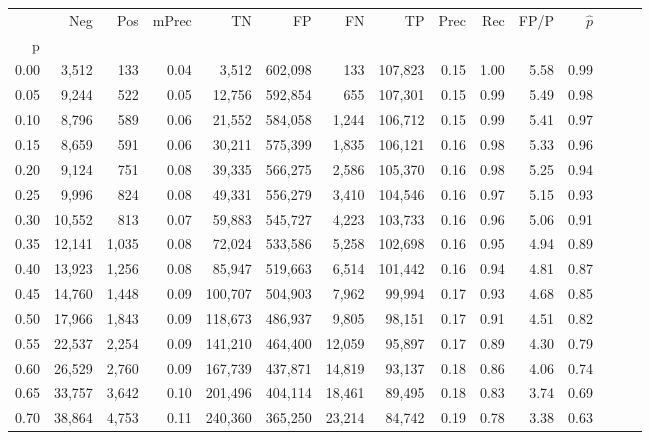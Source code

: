 \begin{tabular}{rrrrrrrrrrrrrrr}
\toprule
{} &     Neg &     Pos & mPrec &       TN &       FP &       FN &       TP &  Prec &   Rec &  FP/P & $\hat{p}$ \\
p    &         &         &       &          &          &          &          &       &       &       &           \\
\midrule
0.00 &   3,512 &     133 &  0.04 &    3,512 &  602,098 &      133 &  107,823 &  0.15 &  1.00 &  5.58 &      0.99 \\
0.05 &   9,244 &     522 &  0.05 &   12,756 &  592,854 &      655 &  107,301 &  0.15 &  0.99 &  5.49 &      0.98 \\
0.10 &   8,796 &     589 &  0.06 &   21,552 &  584,058 &    1,244 &  106,712 &  0.15 &  0.99 &  5.41 &      0.97 \\
0.15 &   8,659 &     591 &  0.06 &   30,211 &  575,399 &    1,835 &  106,121 &  0.16 &  0.98 &  5.33 &      0.96 \\
0.20 &   9,124 &     751 &  0.08 &   39,335 &  566,275 &    2,586 &  105,370 &  0.16 &  0.98 &  5.25 &      0.94 \\
0.25 &   9,996 &     824 &  0.08 &   49,331 &  556,279 &    3,410 &  104,546 &  0.16 &  0.97 &  5.15 &      0.93 \\
0.30 &  10,552 &     813 &  0.07 &   59,883 &  545,727 &    4,223 &  103,733 &  0.16 &  0.96 &  5.06 &      0.91 \\
0.35 &  12,141 &   1,035 &  0.08 &   72,024 &  533,586 &    5,258 &  102,698 &  0.16 &  0.95 &  4.94 &      0.89 \\
0.40 &  13,923 &   1,256 &  0.08 &   85,947 &  519,663 &    6,514 &  101,442 &  0.16 &  0.94 &  4.81 &      0.87 \\
0.45 &  14,760 &   1,448 &  0.09 &  100,707 &  504,903 &    7,962 &   99,994 &  0.17 &  0.93 &  4.68 &      0.85 \\
0.50 &  17,966 &   1,843 &  0.09 &  118,673 &  486,937 &    9,805 &   98,151 &  0.17 &  0.91 &  4.51 &      0.82 \\
0.55 &  22,537 &   2,254 &  0.09 &  141,210 &  464,400 &   12,059 &   95,897 &  0.17 &  0.89 &  4.30 &      0.79 \\
0.60 &  26,529 &   2,760 &  0.09 &  167,739 &  437,871 &   14,819 &   93,137 &  0.18 &  0.86 &  4.06 &      0.74 \\
0.65 &  33,757 &   3,642 &  0.10 &  201,496 &  404,114 &   18,461 &   89,495 &  0.18 &  0.83 &  3.74 &      0.69 \\
0.70 &  38,864 &   4,753 &  0.11 &  240,360 &  365,250 &   23,214 &   84,742 &  0.19 &  0.78 &  3.38 &      0.63 \\

\end{tabular}
